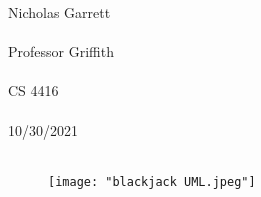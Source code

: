 \documentclass[12pt, a4paper]{article}
\begin{document}
\noindent
Nicholas Garrett\\ \\
Professor Griffith\\ \\
CS 4416\\ \\
10/30/2021\\ \\


\begin{center}
\end{center}

\noindent


\begin{figure}[ht!]
\centering
\texttt{[image: "blackjack UML.jpeg"]}
\end{figure}
\end{document}
